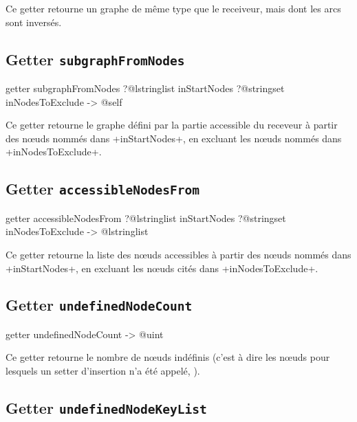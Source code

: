 Ce getter retourne un graphe de même type que le receiveur, mais dont les arcs sont inversés.





\subsection{Getter \texttt{subgraphFromNodes}}

\begin{galgas}
getter subgraphFromNodes
  ?@lstringlist inStartNodes
  ?@stringset inNodesToExclude
  -> @self 
\end{galgas}

Ce getter retourne le graphe défini par la partie accessible du receveur à partir des nœuds nommés dans \ggs+inStartNodes+, en excluant les nœuds nommés dans \ggs+inNodesToExclude+.






\subsection{Getter \texttt{accessibleNodesFrom}}

\begin{galgas}
getter accessibleNodesFrom
  ?@lstringlist inStartNodes
  ?@stringset inNodesToExclude
  -> @lstringlist 
\end{galgas}

Ce getter retourne la liste des nœuds accessibles à partir des nœuds nommés dans \ggs+inStartNodes+, en excluant les nœuds cités dans \ggs+inNodesToExclude+.






\subsection{Getter \texttt{undefinedNodeCount}}

\begin{galgas}
getter undefinedNodeCount -> @uint 
\end{galgas}

Ce getter retourne le nombre de nœuds indéfinis (c'est à dire les nœuds pour lesquels un setter d'insertion n'a été appelé, ).







\subsection{Getter \texttt{undefinedNodeKeyList}}

